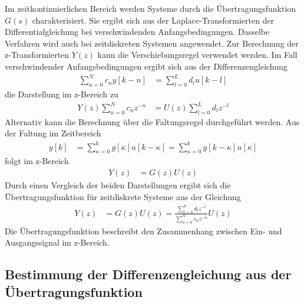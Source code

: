 Im zeitkontinuierlichen Bereich werden Systeme durch die Übertragungsfunktion \(G(s)\) charakterisiert. Sie ergibt sich aus der Laplace-Transformierten der Differentialgleichung bei verschwindenden Anfangsbedingungen. Dasselbe Verfahren wird auch bei zeitdiskreten Systemen angewendet. Zur Berechnung der z-Transformierten \(Y(z)\) kann die Verschiebungsregel verwendet werden. Im Fall verschwindender Anfangsbedingungen ergibt sich aus der Differenzengleichung
\begin{align}
\sum\limits_{n = 0}^{N}{c_{n}  y[ k - n]} &= \sum\limits_{l = 0}^{L}{d_{l}  u[ k - l]} \label{eq:6.20}
\end{align}
die Darstellung im z-Bereich zu
\begin{align}
Y(z)  \sum\limits_{n = 0}^{N}{c_{n}  z^{- n}} &= U(z)  \sum\limits_{l = 0}^{L}{d_{l}  z^{- l}} \label{eq:6.21}
\end{align}
Alternativ kann die Berechnung über die Faltungsregel durchgeführt werden. Aus der Faltung im Zeitbereich
\begin{align}
y[ k] &= \sum\limits_{\kappa = 0}^{k}{g[\kappa]  u[ k - \kappa]} = \sum\limits_{\kappa = 0}^{k}{g[ k - \kappa]  u[\kappa]} \label{eq:6.22}
\end{align}
folgt im z-Bereich
\begin{align}
Y(z) &= G(z)  U(z) \label{eq:6.23}
\end{align}
Durch einen Vergleich der beiden Darstellungen ergibt sich die Übertragungsfunktion für zeitdiskrete Systeme aus der Gleichung
\begin{align}
Y(z) &= G(z)  U(z) = \frac{\sum\limits_{l = 0}^{L}{d_{l}  z^{- l}}}{\sum\limits_{n = 0}^{N}{c_{n}  z^{- n}}}  U(z) \label{eq:6.24}
\end{align}
Die Übertragungsfunktion beschreibt den Zusammenhang zwischen Ein- und Ausgangssignal im z-Bereich.

\subsection{Bestimmung der Differenzengleichung aus der Übertragungsfunktion}\label{sec:bestimmung-der-differenzengleichung-aus-der-uxfcbertragungsfunktion}

